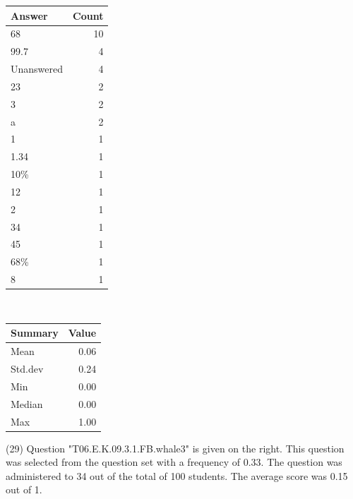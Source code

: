 \documentclass[12pt,nohyper]{tufte-handout}\usepackage[]{graphicx}\usepackage[]{color}
\begin{document}
\begin{center}%
\begin{tabular}{lr}
  \hline
Answer & Count \\ 
  \hline
68 &  10 \\ 
  99.7 &   4 \\ 
  Unanswered &   4 \\ 
  23 &   2 \\ 
  3 &   2 \\ 
  a &   2 \\ 
  1 &   1 \\ 
  1.34 &   1 \\ 
  10\% &   1 \\ 
  12 &   1 \\ 
  2 &   1 \\ 
  34 &   1 \\ 
  45 &   1 \\ 
  68\% &   1 \\ 
  8 &   1 \\ 
   \hline
\end{tabular}
~~~~~~~~%
\begin{tabular}{lr}
  \hline
Summary & Value \\ 
  \hline
Mean & 0.06 \\ 
  Std.dev & 0.24 \\ 
  Min & 0.00 \\ 
  Median & 0.00 \\ 
  Max & 1.00 \\ 
   \hline
\end{tabular}
\end{center}\newpage{} (29) Question "T06.E.K.09.3.1.FB.whale3" is given on the right. This question was selected from the question set with a frequency of 0.33. The question was administered to 34 out of the total of 100 students. The average score was 0.15 out of 1.
\end{document}
